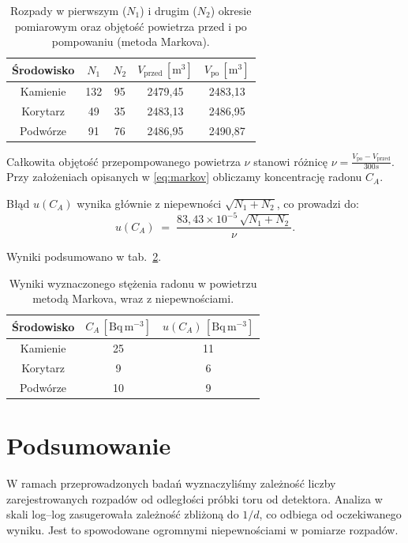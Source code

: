 \documentclass[12pt]{article}
\begin{document}
\begin{table}[H]
	\centering
	\begin{tabular}{c|cc|cc}
		\toprule
		Środowisko & $N_1$ & $N_2$ & $V_{\text{przed}}\,[\mathrm{m^3}]$ & $V_{\text{po}}\,[\mathrm{m^3}]$ \\
		\midrule
		Kamienie & 132 & 95 & 2479{,}45 & 2483{,}13 \\
		Korytarz & 49  & 35 & 2483{,}13 & 2486{,}95 \\
		Podwórze & 91  & 76 & 2486{,}95 & 2490{,}87 \\
		\bottomrule
	\end{tabular}
	\caption{Rozpady w pierwszym ($N_1$) i drugim ($N_2$) okresie pomiarowym oraz objętość powietrza przed i po pompowaniu (metoda Markova).}
	\label{tab:density_measurments}
\end{table}

Całkowita objętość przepompowanego powietrza \(\nu\) stanowi różnicę \(\nu=\frac{V_{\text{po}}-V_{\text{przed}}}{300s}\). Przy założeniach opisanych w \ref{eq:markov} obliczamy koncentrację radonu \(C_A\). 

Błąd \(u(C_A)\) wynika głównie z niepewności \(\sqrt{N_1 + N_2}\), co prowadzi do:
\[
	u(C_A) \;=\; \frac{83{,}43 \times 10^{-5}\,\sqrt{N_1 + N_2}}{\nu}.
\]

Wyniki podsumowano w tab.~\ref{tab:concentration_results}.

\begin{table}[H]
	\centering
	\begin{tabular}{c|cc}
		\toprule
		Środowisko & $C_A\,[\mathrm{Bq\,m^{-3}}]$ & $u(C_A)\,[\mathrm{Bq\,m^{-3}}]$ \\
		\midrule
		Kamienie  & 25 & 11 \\
		Korytarz  & 9  & 6  \\
		Podwórze  & 10 & 9  \\
		\bottomrule
	\end{tabular}
	\caption{Wyniki wyznaczonego stężenia radonu w powietrzu metodą Markova, wraz z niepewnościami.}
	\label{tab:concentration_results}
\end{table}

\section{Podsumowanie}
W ramach przeprowadzonych badań wyznaczyliśmy zależność liczby zarejestrowanych rozpadów od odległości próbki toru od detektora. Analiza w skali log–log zasugerowała zależność zbliżoną do \(1/d\), co odbiega od oczekiwanego wyniku. Jest to spowodowane ogromnymi niepewnościami w pomiarze rozpadów.
\end{document}
